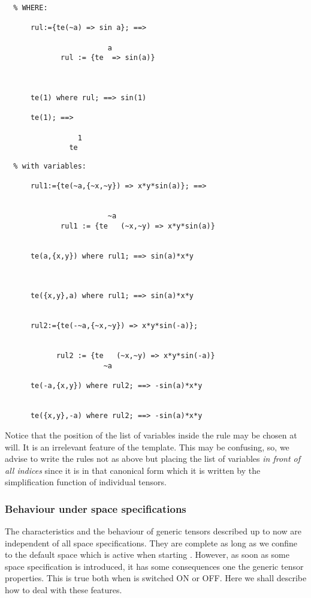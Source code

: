 \begin{verbatim}
  % WHERE:

      rul:={te(~a) => sin a}; ==>

                        a
             rul := {te  => sin(a)}



      te(1) where rul; ==> sin(1)

      te(1); ==>

                 1
               te
\end{verbatim}
\begin{verbatim}
  % with variables:

      rul1:={te(~a,{~x,~y}) => x*y*sin(a)}; ==>


                        ~a
             rul1 := {te   (~x,~y) => x*y*sin(a)}


      te(a,{x,y}) where rul1; ==> sin(a)*x*y



      te({x,y},a) where rul1; ==> sin(a)*x*y


      rul2:={te(-~a,{~x,~y}) => x*y*sin(-a)};


            rul2 := {te   (~x,~y) => x*y*sin(-a)}
                       ~a

      te(-a,{x,y}) where rul2; ==> -sin(a)*x*y


      te({x,y},-a) where rul2; ==> -sin(a)*x*y
\end{verbatim}
Notice that the position of the list of variables inside the rule
may be chosen at will. It is an irrelevant feature of the template.
This may be confusing, so, we advise to write the rules not as
above but placing the list of variables \emph{in front of all indices}
since it is in that canonical form which it is written by the simplification
function of individual tensors.

\subsubsection{Behaviour under space specifications}
The characteristics and the behaviour of generic tensors described up to now
are independent of all space specifications. They are complete as long as
we confine to the default space which is active when starting .
However, as soon as some space specification is introduced, it has some
consequences one the generic tensor properties. This is true both when
 is switched ON or OFF. Here we shall describe
how to deal with these features.

